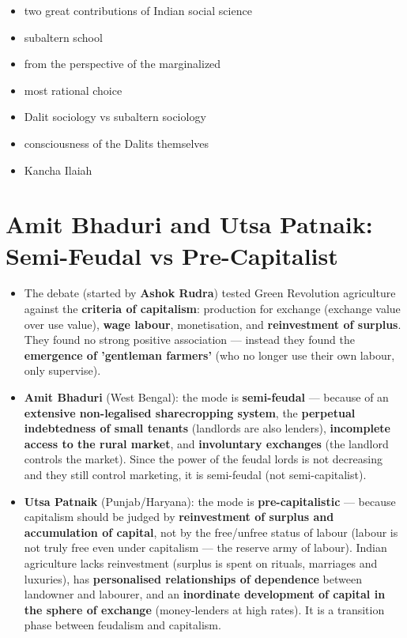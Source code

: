 \begin{QuickRevision}
\begin{itemize}
\item two great contributions of Indian social science
\item subaltern school
\item from the perspective of the marginalized
\item most rational choice
\item Dalit sociology vs subaltern sociology
\item consciousness of the Dalits themselves
\item Kancha Ilaiah
\end{itemize}
\end{QuickRevision}

\section{Amit Bhaduri and Utsa Patnaik: Semi-Feudal vs Pre-Capitalist}

\begin{KeyConcept}
\begin{itemize}
\item The debate (started by \textbf{Ashok Rudra}) tested Green Revolution agriculture against the \textbf{criteria of capitalism}: production for exchange (exchange value over use value), \textbf{wage labour}, monetisation, and \textbf{reinvestment of surplus}. They found no strong positive association --- instead they found the \textbf{emergence of 'gentleman farmers'} (who no longer use their own labour, only supervise).
\item \textbf{Amit Bhaduri} (West Bengal): the mode is \textbf{semi-feudal} --- because of an \textbf{extensive non-legalised sharecropping system}, the \textbf{perpetual indebtedness of small tenants} (landlords are also lenders), \textbf{incomplete access to the rural market}, and \textbf{involuntary exchanges} (the landlord controls the market). Since the power of the feudal lords is not decreasing and they still control marketing, it is semi-feudal (not semi-capitalist).
\item \textbf{Utsa Patnaik} (Punjab/Haryana): the mode is \textbf{pre-capitalistic} --- because capitalism should be judged by \textbf{reinvestment of surplus and accumulation of capital}, not by the free/unfree status of labour (labour is not truly free even under capitalism --- the reserve army of labour). Indian agriculture lacks reinvestment (surplus is spent on rituals, marriages and luxuries), has \textbf{personalised relationships of dependence} between landowner and labourer, and an \textbf{inordinate development of capital in the sphere of exchange} (money-lenders at high rates). It is a transition phase between feudalism and capitalism.
\end{itemize}
\end{KeyConcept}

